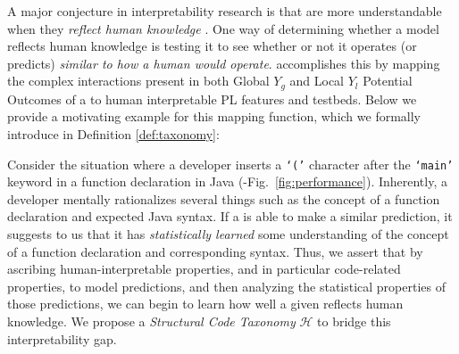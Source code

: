 A major conjecture in interpretability research is that \nlms are more understandable when they \textit{reflect human knowledge} \citep{Kim2018InterpretabilityTCAV}. One way of determining whether a model reflects human knowledge is testing it to see whether or not it operates (or predicts) \textit{similar to how a human would operate}. \codegen accomplishes this by mapping the complex interactions present in both Global $Y_g$ and Local $Y_l$ Potential Outcomes of a \nlm to human interpretable PL features and testbeds. Below we provide a motivating example for this mapping function, which we formally introduce in Definition \ref{def:taxonomy}:

\begin{exmp}
\label{exmp:outcome}
Consider the situation where a developer inserts a \texttt{\small `('} character after the \texttt{\small `main'} keyword in a function declaration in Java ({}-Fig.~\ref{fig:performance}). Inherently, a developer mentally rationalizes several things such as the concept of a function declaration and expected Java syntax. If a \nlm is able to make a similar prediction, it suggests to us that it has \textit{statistically learned} some understanding of the concept of a function declaration and corresponding syntax. Thus, we assert that by ascribing human-interpretable properties, and in particular code-related properties, to model predictions, and then analyzing the statistical properties of those predictions, we can begin to learn how well a given \nlm reflects human knowledge. We propose a \textit{Structural Code Taxonomy} $\mathcal{H}$ to bridge this interpretability gap.
\end{exmp}


